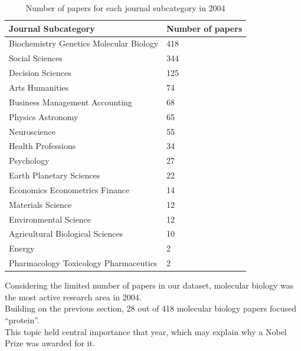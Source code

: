 \documentclass{article}
\begin{document}
\begin{table}[H]
	\caption{Number of papers for each journal subcategory in 2004}
	\centering
	\begin{tabular}{|l|l|}
		\hline
		\textbf{Journal Subcategory}            & \textbf{Number of papers} \\ \hline
		Biochemistry Genetics Molecular Biology & 418                       \\ \hline
		Social Sciences                         & 344                       \\ \hline
		Decision Sciences                       & 125                       \\ \hline
		Arts Humanities                         & 74                        \\ \hline
		Business Management Accounting          & 68                        \\ \hline
		Physics Astronomy                       & 65                        \\ \hline
		Neuroscience                            & 55                        \\ \hline
		Health Professions                      & 34                        \\ \hline
		Psychology                              & 27                        \\ \hline
		Earth Planetary Sciences                & 22                        \\ \hline
		Economics Econometrics Finance          & 14                        \\ \hline
		Materials Science                       & 12                        \\ \hline
		Environmental Science                   & 12                        \\ \hline
		Agricultural Biological Sciences        & 10                        \\ \hline
		Energy                                  & 2                         \\ \hline
		Pharmacology Toxicology Pharmaceutics   & 2                         \\ \hline
	\end{tabular}
	\label{tab:papersPerSubcategoryPerYear}
\end{table}

Considering the limited number of papers in our dataset, molecular biology
was the most active research area in 2004.\\
Building on the previous section, 28 out of 418 molecular biology papers
focused ``protein''.\\
This topic held central importance that year, which may explain why a Nobel
Prize was awarded for it.
\end{document}
